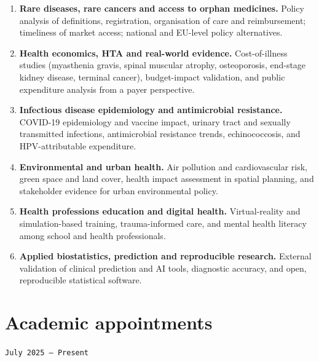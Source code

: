 \documentclass[
  10.5pt,
  a4paper,
  DIV=11,
  numbers=noendperiod]{scrartcl}
\providecommand{\tightlist}{%
  \setlength{\itemsep}{0pt}\setlength{\parskip}{0pt}}
\let\oldtexttt\texttt
\renewcommand{\texttt}[1]{{\color{cvbronze}\small\oldtexttt{#1}}}
\begin{document}
\begin{enumerate}
\def\labelenumi{\arabic{enumi}.}
\tightlist
\item
  \textbf{Rare diseases, rare cancers and access to orphan medicines.}
  Policy analysis of definitions, registration, organisation of care and
  reimbursement; timeliness of market access; national and EU-level
  policy alternatives.
\item
  \textbf{Health economics, HTA and real-world evidence.}
  Cost-of-illness studies (myasthenia gravis, spinal muscular atrophy,
  osteoporosis, end-stage kidney disease, terminal cancer),
  budget-impact validation, and public expenditure analysis from a payer
  perspective.
\item
  \textbf{Infectious disease epidemiology and antimicrobial resistance.}
  COVID-19 epidemiology and vaccine impact, urinary tract and sexually
  transmitted infections, antimicrobial resistance trends,
  echinococcosis, and HPV-attributable expenditure.
\item
  \textbf{Environmental and urban health.} Air pollution and
  cardiovascular risk, green space and land cover, health impact
  assessment in spatial planning, and stakeholder evidence for urban
  environmental policy.
\item
  \textbf{Health professions education and digital health.}
  Virtual-reality and simulation-based training, trauma-informed care,
  and mental health literacy among school and health professionals.
\item
  \textbf{Applied biostatistics, prediction and reproducible research.}
  External validation of clinical prediction and AI tools, diagnostic
  accuracy, and open, reproducible statistical software.
\end{enumerate}

\section{Academic appointments}\label{academic-appointments}

\texttt{July\ 2025\ –\ Present}
\end{document}
